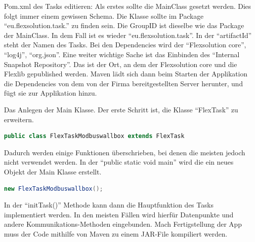 \begin{compactenum}
    
    \item Pom.xml des Tasks editieren: Als erstes sollte die MainClass gesetzt werden. Dies folgt immer einem gewissen Schema. Die Klasse sollte im Package “eu.flexsolution.task.” zu finden sein. Die GroupID ist dieselbe wie das Package der MainClass. In dem Fall ist es wieder “eu.flexsolution.task”.  In der “artifactId” steht der Namen des Tasks. Bei den Dependencies wird der “Flexsolution core”, “log4j”, “org.json”. Eine weiter wichtige Sache ist das Einbinden des “Internal Snapshot Repository”. Das ist der Ort, an dem der Flexsolution core und die Flexlib gepublished werden. Maven lädt sich dann beim Starten der Applikation die Dependencies von dem von der Firma bereitgestellten Server herunter, und fügt sie zur Applikation hinzu.  
    \item Das Anlegen der Main Klasse. Der erste Schritt ist, die Klasse “FlexTask” zu erweitern. 
    \begin{lstlisting}[language=java,caption=Example Element,label=lst:impl:foo]
        public class FlexTaskModbuswallbox extends FlexTask 
    \end{lstlisting}
    Dadurch werden einige Funktionen überschrieben, bei denen die meisten jedoch nicht verwendet werden. In der “public static void main” wird die ein neues Objekt der Main Klasse erstellt.
    \begin{lstlisting}[language=java,caption=Example Element,label=lst:impl:foo]
        new FlexTaskModbuswallbox();  
    \end{lstlisting}
    In der “initTask(){}” Methode kann dann die Hauptfunktion des Tasks implementiert werden. In den meisten Fällen wird hierfür Datenpunkte und andere Kommunikations-Methoden eingebunden. Mach Fertigstellung der App muss der Code mithilfe von Maven zu einem JAR-File kompiliert werden.  
    

\end{compactenum}
